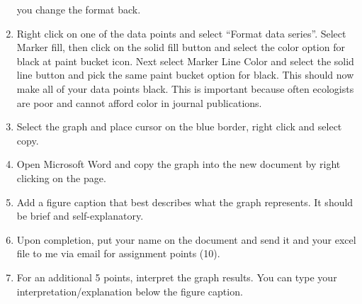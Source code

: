 \documentclass[12pt, hidelinks]{exam}
\begin{document}
\begin{enumerate}
  you change the format back.
\item
  Right click on one of the data points and select ``Format data
  series''. Select Marker fill, then click on the solid fill button and
  select the color option for black at paint bucket icon. Next select
  Marker Line Color and select the solid line button and pick the same
  paint bucket option for black. This should now make all of your data
  points black. This is important because often ecologists are poor and
  cannot afford color in journal publications.
\item
  Select the graph and place cursor on the blue border, right click and
  select copy.
\item
  Open Microsoft Word and copy the graph into the new document by right
  clicking on the page.
\item
  Add a figure caption that best describes what the graph represents. It
  should be brief and self-explanatory.
\item
  Upon completion, put your name on the document and send it and your
  excel file to me via email for assignment points (10).
\item
  For an additional 5 points, interpret the graph results. You can type
  your interpretation/explanation below the figure caption.
\end{enumerate}
\end{document}
